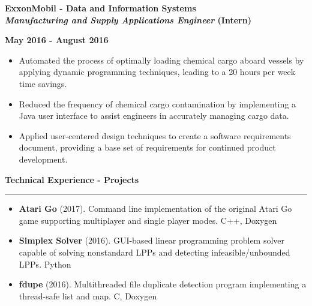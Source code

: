 \documentclass[10pt,letterpaper]{article}
\begin{document}
\medskip

\begin{minipage}[t]{0.53\textwidth}
    \begin{flushleft}
        \textbf{ExxonMobil - Data and Information Systems}\\
        \textbf{\textit{Manufacturing and Supply Applications Engineer} (Intern)}\\
    \end{flushleft}
\end{minipage}
\begin{minipage}[t]{0.44\textwidth}
    \begin{flushright}
        \textbf{May 2016 - August 2016}
    \end{flushright}
\end{minipage}

\begin{itemize}[noitemsep,topsep=0pt]
    \setlength\itemsep{0.1em}
    \item Automated the process of optimally loading chemical cargo aboard
        vessels by applying dynamic programming techniques, leading to a 20
        hours per week time savings.
    \item Reduced the frequency of chemical cargo contamination by implementing
        a Java user interface to assist engineers in accurately managing cargo
        data.
    \item Applied user-centered design techniques to create a software
        requirements document, providing a base set of requirements for
        continued product development.
\end{itemize}

\medskip

\begin{large}
    \textbf{Technical Experience - Projects}
\end{large}

\smallskip \hrule \smallskip

\begin{itemize}[topsep=0pt]
    \setlength\itemsep{0.1em}
    \item \textbf{Atari Go} (2017). Command line implementation of the original
          Atari Go game supporting multiplayer and single player modes.
          C++, Doxygen
    \item \textbf{Simplex Solver} (2016). GUI-based linear programming problem
          solver capable of solving nonstandard LPPs and detecting
          infeasible/unbounded LPPs. Python
    \item \textbf{fdupe} (2016). Multithreaded file duplicate detection program
          implementing a thread-safe list and map. C, Doxygen
\end{itemize}
\end{document}
